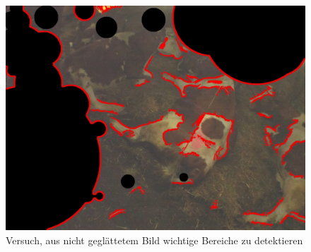 \begin{figure}[H]
	\center
	\includegraphics[scale=0.43]{Grafiken/entwicklung/11thresholdedNotEqualized.jpg}
	\caption{Versuch, aus nicht geglättetem Bild wichtige Bereiche zu detektieren} 
	\label{fig: Versuch, aus nicht geglättetem Bild wichtige Bereiche zu detektieren} 
\end{figure}

